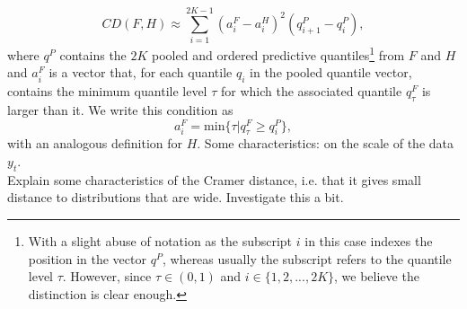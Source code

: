 \begin{equation}
CD(F,H) \approx \sum_{i = 1}^{2K-1} (a_i^F - a_i^H)^2 (q_{i+1}^{P} - q_{i}^{P}),
\end{equation} 
where $q^P$ contains the $2K$ pooled and ordered predictive quantiles\footnote{With a slight abuse of notation as the subscript $i$ in this case indexes the position in the vector $q^P$, whereas usually the subscript refers to the quantile level $\tau$. However, since $\tau \in (0,1)$ and $i \in \{1,2,...,2K\}$, we believe the distinction is clear enough.} from $F$ and $H$ and $a_i^F$ is a vector that, for each quantile $q_i$ in the pooled quantile vector, contains the minimum quantile level $\tau$ for which the associated quantile $q_\tau^F$ is larger than it. We write this condition as
\begin{equation*}
a_i^F = \text{min}\{\tau | q_\tau^F \geq q_i^P\},
\end{equation*}
with an analogous definition for $H$.
Some characteristics: on the scale of the data $y_t$.\\

Explain some characteristics of the Cramer distance, i.e. that it gives small distance to distributions that are wide. Investigate this a bit.
